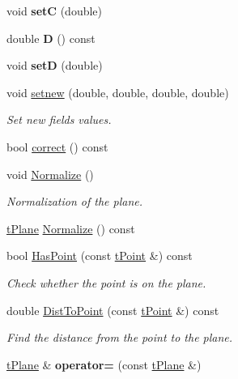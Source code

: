 \begin{DoxyCompactItemize}
\item 
\mbox{\label{classtPlane_a4ad41ca722a6da81d3758631f67db13b}} 
void {\bfseries setC} (double)
\item 
\mbox{\label{classtPlane_a962da3f8ce1289d44438ad8f7ffbbbfa}} 
double {\bfseries D} () const
\item 
\mbox{\label{classtPlane_aab58e6aa9e9e941a12d2aa5dd85cbc8c}} 
void {\bfseries setD} (double)
\item 
\mbox{\label{classtPlane_a21e7cda32a0a6111f92cb8102915d304}} 
void \hyperlink{classtPlane_a21e7cda32a0a6111f92cb8102915d304}{setnew} (double, double, double, double)
\begin{DoxyCompactList}\small\item\em Set new fields values. \end{DoxyCompactList}\item 
bool \hyperlink{classtPlane_a382974c179a2bac3eb2da1d18c4dd860}{correct} () const
\item 
\mbox{\label{classtPlane_a7891a14a7511d7526633be820ce1604d}} 
void \hyperlink{classtPlane_a7891a14a7511d7526633be820ce1604d}{Normalize} ()
\begin{DoxyCompactList}\small\item\em Normalization of the plane. \end{DoxyCompactList}\item 
\hyperlink{classtPlane}{t\+Plane} \hyperlink{classtPlane_a8957e329f01270932a9a5b73ee9fe33a}{Normalize} () const
\item 
\mbox{\label{classtPlane_a90727fd4cebd6ddb9a82482ad89a9edd}} 
bool \hyperlink{classtPlane_a90727fd4cebd6ddb9a82482ad89a9edd}{Has\+Point} (const \hyperlink{classtPoint}{t\+Point} \&) const
\begin{DoxyCompactList}\small\item\em Check whether the point is on the plane. \end{DoxyCompactList}\item 
\mbox{\label{classtPlane_a08f5fac758dd76797e3571c76ec7b3fa}} 
double \hyperlink{classtPlane_a08f5fac758dd76797e3571c76ec7b3fa}{Dist\+To\+Point} (const \hyperlink{classtPoint}{t\+Point} \&) const
\begin{DoxyCompactList}\small\item\em Find the distance from the point to the plane. \end{DoxyCompactList}\item 
\mbox{\label{classtPlane_a90739f10ab1734192c38128f8b267c7f}} 
\hyperlink{classtPlane}{t\+Plane} \& {\bfseries operator=} (const \hyperlink{classtPlane}{t\+Plane} \&)
\end{DoxyCompactItemize}
